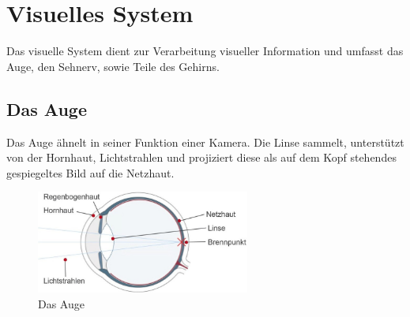 \section{Visuelles System}
Das visuelle System dient zur Verarbeitung visueller Information und umfasst das Auge, den Sehnerv, sowie Teile des Gehirns.

\subsection{Das Auge}
Das Auge ähnelt in seiner Funktion einer Kamera. Die Linse sammelt, unterstützt von der Hornhaut, Lichtstrahlen und projiziert diese als auf dem Kopf stehendes gespiegeltes Bild auf die Netzhaut.
\begin{figure}
	\centering
	\includegraphics[width=7cm]{images/auge.jpg}
	\caption{Das Auge \cite{auge}}
\end{figure}